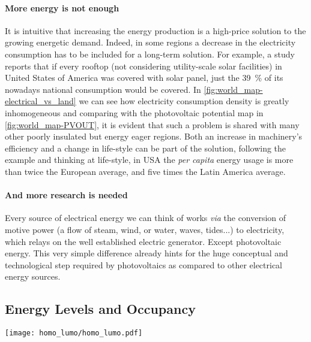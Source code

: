 	\paragraph{More energy is not enough} It is intuitive that increasing the energy production is a high-price solution to the growing energetic demand.
	Indeed, in some regions a decrease in the electricity consumption has to be included for a long-term solution.
	For example, a study\cite{Margolis2016} reports that if every rooftop (not considering utility-scale solar facilities) in United States of America was covered with solar panel, just the 39~\% of its nowadays national consumption would be covered.
	In \cref{fig:world_map-electrical_vs_land} we can see how electricity consumption density is greatly inhomogeneous and comparing with the photovoltaic potential map in \cref{fig:world_map-PVOUT}, it is evident that such a problem is shared with many other poorly insulated but energy eager regions.
	Both an increase in machinery's efficiency and a change in life-style can be part of the solution, following the example and thinking at life-style, in USA the \textsl{per capita} energy usage is more than twice the European average, and five times the Latin America average.\cite{IEA}

	\paragraph{And more research is needed} Every source of electrical energy we can think of works \textsl{via} the conversion of motive power (a flow of steam, wind, or water, waves, tides...) to electricity, which relays on the well established electric generator.
	Except photovoltaic energy.
	This very simple difference already hints for the huge conceptual and technological step required by photovoltaics as compared to other electrical energy sources.


	\subsection{Energy Levels and Occupancy}
			
	\begin{SCfigure}
		\centering
		\texttt{[image: homo\_lumo/homo\_lumo.pdf]}
		\label{fig:homo_lumo}
	\end{SCfigure}
		

